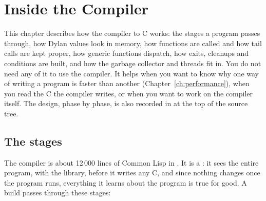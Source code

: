 \chapter{Inside the Compiler}\label{ch:internals}
\sloppy

This chapter describes how the compiler to C works: the stages a program
passes through, how Dylan values look in memory, how functions are
called and how tail calls are kept proper, how generic functions
dispatch, how exits, cleanups and conditions are built, and how the
garbage collector and threads fit in. You do not need any of it to use
the compiler. It helps when you want to know why one way of writing a
program is faster than another (Chapter~\ref{ch:performance}), when you
read the C the compiler writes, or when you want to work on the compiler
itself. The design, phase by phase, is also recorded in
 at the top of the source tree.

\section{The stages}\label{sec:internals-pipeline}

The compiler is about 12\,000 lines of Common Lisp in .
It is a : it sees the entire program, with
the library, before it writes any C, and since nothing changes once the
program runs, everything it learns about the program is true for good.
A build passes through these stages:

